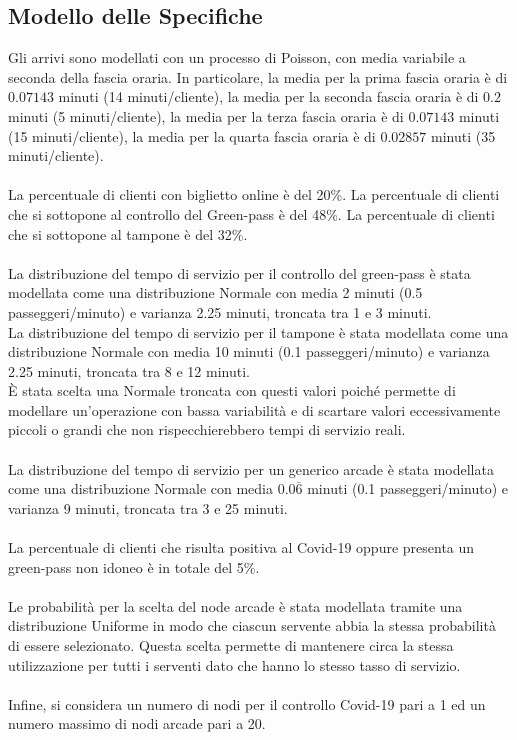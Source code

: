 \documentclass{article}
\begin{document}
\subsection{Modello delle Specifiche}
Gli arrivi sono modellati con un processo di Poisson, con media variabile a seconda della fascia oraria. In particolare, la media per la prima fascia oraria è di $0.07143$  minuti (14 minuti/cliente), la media per la seconda fascia oraria è di $0.2$  minuti (5 minuti/cliente), la media per la terza fascia oraria è di $0.07143$   minuti (15 minuti/cliente), la media per la quarta fascia oraria è di $0.02857$  minuti (35 minuti/cliente).
\\ \\
La percentuale di clienti con biglietto online è del 20\%. La percentuale di clienti che si sottopone al controllo del  Green-pass è del 48\%. La percentuale di clienti che si sottopone al tampone è del 32\%.
\\ \\
La distribuzione del tempo di servizio per il controllo del green-pass è stata modellata
come una distribuzione Normale con media 2 minuti (0.5 passeggeri/minuto) e varianza 2.25 minuti, troncata tra 1 e 3 minuti. 
\\
La distribuzione del tempo di servizio per il tampone è stata modellata
come una distribuzione Normale con media 10 minuti (0.1 passeggeri/minuto) e varianza 2.25 minuti, troncata tra 8 e 12 minuti. 
\\
È stata scelta una Normale troncata con questi valori poiché permette di modellare un'operazione con bassa variabilità e di scartare valori eccessivamente piccoli o grandi che non rispecchierebbero tempi di servizio reali.
\\ \\
La distribuzione del tempo di servizio per un generico arcade è stata modellata
come una distribuzione Normale con media $0.0\overline{6}$ minuti (0.1 passeggeri/minuto) e varianza 9 minuti, troncata tra 3 e 25 minuti.
\\ \\
La percentuale di clienti che risulta positiva al Covid-19 oppure presenta un green-pass non idoneo è in totale del 5\%.
\\ \\
Le probabilità per la scelta del node arcade è stata modellata tramite una distribuzione Uniforme in modo che ciascun servente abbia la stessa probabilità di essere selezionato. Questa scelta permette di mantenere circa la stessa utilizzazione per tutti i serventi dato che hanno lo stesso tasso di servizio.
\\ \\
Infine, si considera un numero di nodi per il controllo Covid-19 pari a 1 ed un numero massimo di nodi arcade pari a 20.
\end{document}
